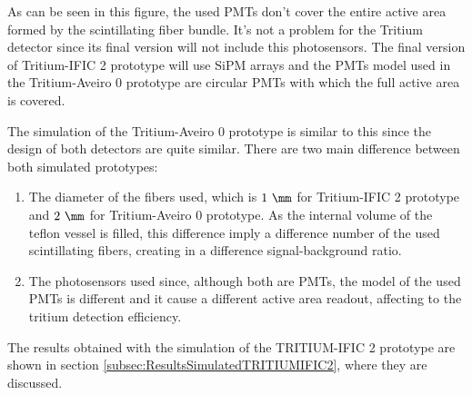 As can be seen in this figure, the used PMTs don't cover the entire active area formed by the scintillating fiber bundle. It's not a problem for the Tritium detector since its final version will not include this photosensors. The final version of Tritium-IFIC 2 prototype will use SiPM arrays and the PMTs model used in the Tritium-Aveiro 0 prototype are circular PMTs with which the full active area is covered.

The simulation of the Tritium-Aveiro 0 prototype is similar to this since the design of both detectors are quite similar. There are two main difference between both simulated prototypes:

\begin{enumerate}

\item{} The diameter of the fibers used, which is $1~\mm$ for Tritium-IFIC 2 prototype and $2~\mm$ for Tritium-Aveiro 0 prototype. As the internal volume of the teflon vessel is filled, this difference imply a difference number of the used scintillating fibers, creating in a difference signal-background ratio.

\item{} The photosensors used since, although both are PMTs, the model of the used PMTs is different and it cause a different active area readout, affecting to the tritium detection efficiency. 

\end{enumerate}

The results obtained with the simulation of the TRITIUM-IFIC 2 prototype are shown in section \ref{subsec:ResultsSimulatedTRITIUMIFIC2}, where they are discussed.